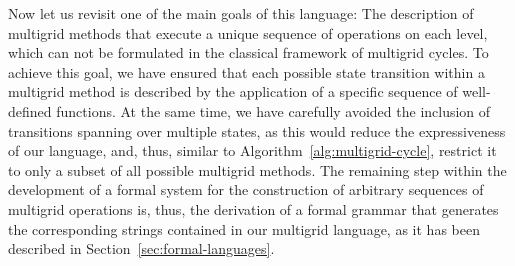 Now let us revisit one of the main goals of this language: The description of multigrid methods that execute a unique sequence of operations on each level, which can not be formulated in the classical framework of multigrid cycles.
To achieve this goal, we have ensured that each possible state transition within a multigrid method is described by the application of a specific sequence of well-defined functions. 
At the same time, we have carefully avoided the inclusion of transitions spanning over multiple states, as this would reduce the expressiveness of our language, and, thus, similar to Algorithm~\ref{alg:multigrid-cycle}, restrict it to only a subset of all possible multigrid methods.
The remaining step within the development of a formal system for the construction of arbitrary sequences of multigrid operations is, thus, the derivation of a formal grammar that generates the corresponding strings contained in our multigrid language, as it has been described in Section~\ref{sec:formal-languages}.

